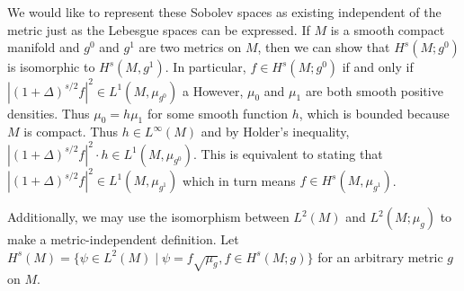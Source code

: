 \documentclass[12pt]{amsart}
\begin{document}
We would like to represent these Sobolev spaces as existing independent of the metric
just as the Lebesgue spaces can be expressed.
If $M$ is a smooth compact manifold and $g^0$ and $g^1$ are two metrics on $M$,
then we can show that $H^s(M;g^0)$ is isomorphic to $H^s(M,g^1)$.
In particular, $f \in H^s(M;g^0)$ if and only if $|(1+\Delta)^{s/2}f|^2 \in L^1( M , \mu_{g^0})$ a
However, $\mu_0$ and $\mu_1$ are both smooth positive densities.
Thus $\mu_0  = h \mu_1$ for some smooth function $h$, which is bounded because $M$ is compact.
Thus $h \in L^\infty(M)$ and by Holder's inequality, $|(1+\Delta)^{s/2}f|^2 \cdot h \in L^1(M , \mu_{g^0})$.
This is equivalent to stating that $|(1+\Delta)^{s/2}f|^2 \in L^1(M,\mu_{g^1})$ which in turn means
$f \in H^s(M, \mu_{g^1})$.

Additionally, we may use the isomorphism between $L^2(M)$ and $L^2(M;\mu_g)$ to make a metric-independent definition.
Let $H^s(M) = \{ \psi \in L^2(M) \mid \psi = f \sqrt{\mu_g} , f \in H^s(M;g) \}$ for an arbitrary metric $g$ on $M$.

\end{document}

